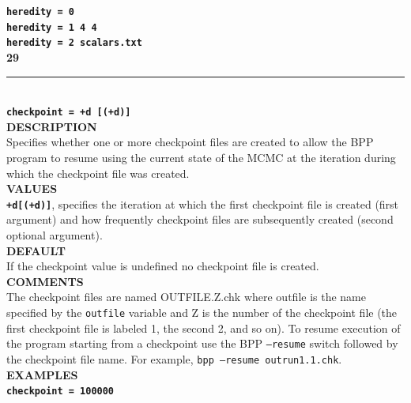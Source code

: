 \documentclass[a4paper]{book}
\numberwithin{equation}{section} \renewcommand{\baselinestretch}{0.55}
\begin{document}
\textbf{\texttt{heredity = 0}} \vspace{5pt}\\
\textbf{\texttt{heredity = 1 4 4}}\vspace{5pt}\\
\textbf{\texttt{heredity = 2 scalars.txt}} \vspace{10pt}\\
\textbf{{\large 29}} \\
\noindent\rule{\textwidth}{0.8pt} \\
\textbf{{\Large \texttt{checkpoint = +d [(+d)]}}} \vspace{5pt}\\
\textbf{DESCRIPTION} \vspace{5pt}\\
Specifies whether one or more checkpoint files are created to allow
the BPP program to resume using the current state of the MCMC at the
iteration during which the checkpoint file was created.
\vspace{5pt}\\
\textbf{VALUES} \vspace{5pt}\\
\textbf{\texttt{+d[(+d)]}}, specifies the iteration at which the first
checkpoint file is created (first argument) and how frequently
checkpoint files are subsequently created (second optional argument).
\vspace{5pt}\\
\textbf{DEFAULT} \vspace{5pt}\\
If the checkpoint value is undefined no checkpoint file is created.
\vspace{5pt}\\
\textbf{COMMENTS} \vspace{5pt}\\
The checkpoint files are named OUTFILE.Z.chk where outfile is the name
specified by the \texttt{outfile} variable and Z is the number of the
checkpoint file (the first checkpoint file is labeled 1, the second 2,
and so on). To resume execution of the program starting from a
checkpoint use the BPP \texttt{--resume} switch followed by the
checkpoint file name.  For example, \texttt{bpp --resume
  outrun1.1.chk}.
\vspace{5pt}\\
\textbf{EXAMPLES} \vspace{5pt}\\
\textbf{\texttt{checkpoint = 100000}} \vspace{5pt}\\
\end{document}
